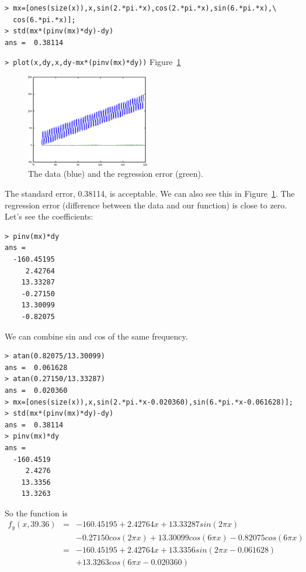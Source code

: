 \documentclass[a4paper]{article}
\begin{document}
\begin{verbatim}
> mx=[ones(size(x)),x,sin(2.*pi.*x),cos(2.*pi.*x),sin(6.*pi.*x),\
  cos(6.*pi.*x)];
> std(mx*(pinv(mx)*dy)-dy)
ans =  0.38114
\end{verbatim}
\verb|> plot(x,dy,x,dy-mx*(pinv(mx)*dy))| \hfill Figure~\ref{fig:fyx-lc}

\begin{figure}[htb]
\begin{center}
\includegraphics[width=0.48\textwidth]{fyx-lc.png}
\end{center}
\caption{The data (blue) and the regression error (green).}
\label{fig:fyx-lc}
\end{figure}
The standard error, 0.38114, is acceptable.
We can also see this in Figure~\ref{fig:fyx-lc}.
The regression error (difference between the data and our function) is close
to zero.
Let's see the coefficients:

\begin{verbatim}
> pinv(mx)*dy
ans =
  -160.45195
     2.42764
    13.33287
    -0.27150
    13.30099
    -0.82075
\end{verbatim}

We can combine sin and cos of the same frequency.

\begin{verbatim}
> atan(0.82075/13.30099)
ans =  0.061628
> atan(0.27150/13.33287)
ans =  0.020360
> mx=[ones(size(x)),x,sin(2.*pi.*x-0.020360),sin(6.*pi.*x-0.061628)];
> std(mx*(pinv(mx)*dy)-dy)
ans =  0.38114
> pinv(mx)*dy
ans =
  -160.4519
     2.4276
    13.3356
    13.3263
\end{verbatim}
So the function is
\begin{eqnarray}
f_y(x,39.36) & = & -160.45195+2.42764x+13.33287sin(2\pi x) \nonumber \\
             &   & -0.27150cos(2\pi x)+13.30099cos(6\pi x)-0.82075cos(6\pi x) \nonumber \\
             & = & -160.45195+2.42764x+13.3356sin(2\pi x-0.061628) \nonumber \\
             &   & +13.3263cos(6\pi x-0.020360)
\end{eqnarray}
\end{document}
